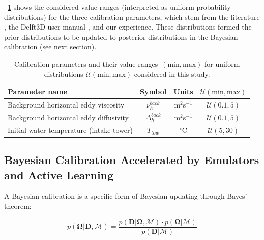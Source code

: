 \documentclass[draft,linenumbers,onecolumn]{agujournal2019} %
\begin{document}
\tablename{~\ref{TableParam}} shows the considered value ranges (interpreted as uniform probability distributions) for the three calibration parameters, which stem from the literature \cite<see supplemental material and>{dong_lake_2020, bermudez_res_2018, li_efdc_2010, kosucu_delft3d_2019, dissanayake_delft3d_2019, salehi_delft3d_2017}, the Delft3D user manual \cite{deltares_simulation_2022}, and our experience. These distributions formed the prior distributions to be updated to posterior distributions in the Bayesian calibration (see next section).

\begin{table}[h]
	\centering
	\caption{Calibration parameters and their value ranges~$(\mbox{min}, \mbox{max})$ for uniform distributions $\mathcal{U}(\mbox{min}, \mbox{max})$ considered in this study.}
	\begin{tabular}{l c c c} 
		\hline
		Parameter name & Symbol & Units & $\mathcal{U}(\mbox{min}, \mbox{max})$  \\
		\hline
		Background horizontal eddy viscosity &  \(\nu_{h}^{back}\) & m$^2$s$^{-1}$ & $\mathcal{U}(0.1, 5)$  \\
		Background horizontal eddy diffusivity& \(\Delta_{h}^{back}\) & m$^2$s$^{-1}$ & $\mathcal{U}(0.1, 5)$ \\
		Initial water temperature (intake tower) & \(T_{tow}\) & \(^\circ\)C & $\mathcal{U}(5, 30)$ \\
		\hline
	\end{tabular}
	\label{TableParam}
\end{table}


\subsection{Bayesian Calibration Accelerated by Emulators and Active Learning}
\label{sec:bayesCal}

A Bayesian calibration is a specific form of Bayesian updating through Bayes' theorem:

\begin{equation}
	p\left( \mathbf{\Omega} \vert \mathbf{D},\mathcal{M} \right) = \frac{p\left( \mathbf{D} \vert \mathbf{\Omega},\mathcal{M} \right) \cdot p\left( \mathbf{\Omega}\vert \mathcal{M}\right) }{p\left( \mathbf{D}\vert\mathcal{M}\right) }
	\label{eq:Bayes}
\end{equation}
\end{document}
